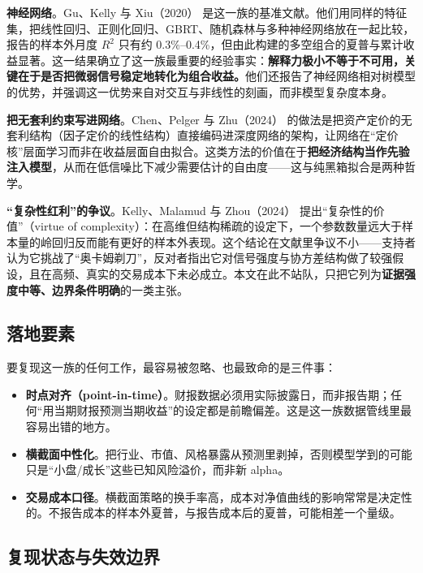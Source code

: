\textbf{神经网络}。Gu、Kelly 与 Xiu（2020）\cite{gukellyxiu2020} 是这一族的基准文献。他们用同样的特征集，把线性回归、正则化回归、GBRT、随机森林与多种神经网络放在一起比较，报告的样本外月度 $R^2$ 只有约 0.3\%--0.4\%，但由此构建的多空组合的夏普与累计收益显著。这一结果确立了这一族最重要的经验事实：\textbf{解释力极小不等于不可用，关键在于是否把微弱信号稳定地转化为组合收益。}他们还报告了神经网络相对树模型的优势，并强调这一优势来自对交互与非线性的刻画，而非模型复杂度本身。

\textbf{把无套利约束写进网络}。Chen、Pelger 与 Zhu（2024）\cite{chenpelgerzhu2024} 的做法是把资产定价的无套利结构（因子定价的线性结构）直接编码进深度网络的架构，让网络在“定价核”层面学习而非在收益层面自由拟合。这类方法的价值在于\textbf{把经济结构当作先验注入模型}，从而在低信噪比下减少需要估计的自由度——这与纯黑箱拟合是两种哲学。

\textbf{“复杂性红利”的争议}。Kelly、Malamud 与 Zhou（2024）\cite{kellymalamudzhou2024} 提出“复杂性的价值”（virtue of complexity）：在高维但结构稀疏的设定下，一个参数数量远大于样本量的岭回归反而能有更好的样本外表现。这个结论在文献里争议不小——支持者认为它挑战了“奥卡姆剃刀”，反对者指出它对信号强度与协方差结构做了较强假设，且在高频、真实的交易成本下未必成立。本文在此不站队，只把它列为\textbf{证据强度中等、边界条件明确}的一类主张。

\subsection{落地要素}

要复现这一族的任何工作，最容易被忽略、也最致命的是三件事：

\begin{itemize}
  \item \textbf{时点对齐（point-in-time）}。财报数据必须用实际披露日，而非报告期；任何“用当期财报预测当期收益”的设定都是前瞻偏差。这是这一族数据管线里最容易出错的地方。
  \item \textbf{横截面中性化}。把行业、市值、风格暴露从预测里剥掉，否则模型学到的可能只是“小盘/成长”这些已知风险溢价，而非新 alpha。
  \item \textbf{交易成本口径}。横截面策略的换手率高，成本对净值曲线的影响常常是决定性的。不报告成本的样本外夏普，与报告成本后的夏普，可能相差一个量级。
\end{itemize}

\subsection{复现状态与失效边界}

